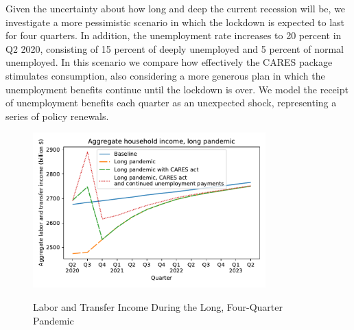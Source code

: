 \documentclass[titlepage,letterpaper]{\econtex}
\begin{document}
Given the uncertainty about how long and deep the current recession will be, we investigate a more pessimistic scenario in which the lockdown is expected to last for four quarters.
In addition, the unemployment rate increases to 20 percent in Q2 2020, consisting of 15 percent of deeply unemployed and 5 percent of normal unemployed.
In this scenario we compare how effectively the CARES package stimulates consumption, also considering a more generous plan in which the unemployment benefits continue until the lockdown is over.
We model the receipt of unemployment benefits each quarter as an unexpected shock, representing a series of policy renewals.

\begin{figure}
  \centering
  \caption{Labor and Transfer Income During the Long, Four-Quarter Pandemic}
  \label{inc_response_pandemic}
  { \includegraphics[width=0.8\textwidth]{./Figures/AggLT_long_pandemic}}
\end{figure}
\end{document}
